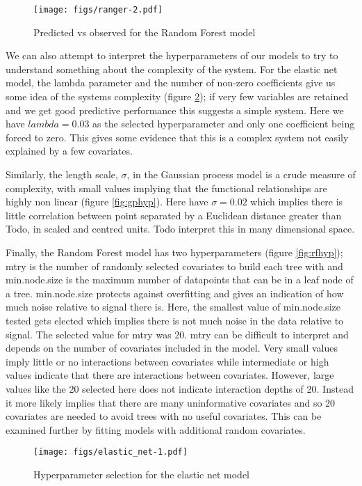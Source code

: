 \documentclass[10pt,]{article}
\begin{document}
\begin{figure}[htbp]
\centering
\texttt{[image: figs/ranger-2.pdf]}
\caption{Predicted vs observed for the Random Forest model\protect\label{fig:rfpredobs}}
\end{figure}

We can also attempt to interpret the hyperparameters of our models to try to understand something about the complexity of the system. For the elastic net model, the lambda parameter and the number of non-zero coefficients give us some idea of the systems complexity (figure \ref{fig:enethyp}); if very few variables are retained and we get good predictive performance this suggests a simple system. Here we have \(lambda = 0.03\) as the selected hyperparameter and only one coefficient being forced to zero. This gives some evidence that this is a complex system not easily explained by a few covariates.

Similarly, the length scale, \(\sigma\), in the Gaussian process model is a crude measure of complexity, with small values implying that the functional relationships are highly non linear (figure \ref{fig:gphyp}). Here have \(\sigma = 0.02\) which implies there is little correlation between point separated by a Euclidean distance greater than Todo, in scaled and centred units. Todo interpret this in many dimensional space.

Finally, the Random Forest model has two hyperparameters (figure \ref{fig:rfhyp}); mtry is the number of randomly selected covariates to build each tree with and min.node.size is the maximum number of datapoints that can be in a leaf node of a tree. min.node.size protects against overfitting and gives an indication of how much noise relative to signal there is. Here, the smallest value of min.node.size tested gets elected which implies there is not much noise in the data relative to signal. The selected value for mtry was 20. mtry can be difficult to interpret and depends on the number of covariates included in the model. Very small values imply little or no interactions between covariates while intermediate or high values indicate that there are interactions between covariates. However, large values like the 20 selected here does not indicate interaction depths of 20. Instead it more likely implies that there are many uninformative covariates and so 20 covariates are needed to avoid trees with no useful covariates. This can be examined further by fitting models with additional random covariates.

\begin{figure}[htbp]
\centering
\texttt{[image: figs/elastic\_net-1.pdf]}
\caption{Hyperparameter selection for the elastic net model\protect\label{fig:enethyp}}
\end{figure}
\end{document}

